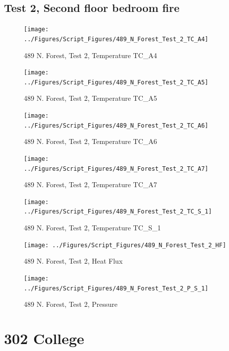 \documentclass[12pt,oneside]{book}
\begin{document}
\clearpage


\subsection{Test 2, Second floor bedroom fire}

\begin{figure}[!ht]
\texttt{[image: ../Figures/Script\_Figures/489\_N\_Forest\_Test\_2\_TC\_A4]}
\caption{489 N. Forest, Test 2, Temperature TC\_A4}
\label{fig:489_N_Forest_Test_2_TC_A4}
\end{figure}

\begin{figure}[!ht]
\texttt{[image: ../Figures/Script\_Figures/489\_N\_Forest\_Test\_2\_TC\_A5]}
\caption{489 N. Forest, Test 2, Temperature TC\_A5}
\label{fig:489_N_Forest_Test_2_TC_A5}
\end{figure}

\begin{figure}[!ht]
\texttt{[image: ../Figures/Script\_Figures/489\_N\_Forest\_Test\_2\_TC\_A6]}
\caption{489 N. Forest, Test 2, Temperature TC\_A6}
\label{fig:489_N_Forest_Test_2_TC_A6}
\end{figure}

\begin{figure}[!ht]
\texttt{[image: ../Figures/Script\_Figures/489\_N\_Forest\_Test\_2\_TC\_A7]}
\caption{489 N. Forest, Test 2, Temperature TC\_A7}
\label{fig:489_N_Forest_Test_2_TC_A7}
\end{figure}

\begin{figure}[!ht]
\texttt{[image: ../Figures/Script\_Figures/489\_N\_Forest\_Test\_2\_TC\_S\_1]}
\caption{489 N. Forest, Test 2, Temperature TC\_S\_1}
\label{fig:489_N_Forest_Test_2_TC_S_1}
\end{figure}

\begin{figure}[!ht]
\texttt{[image: ../Figures/Script\_Figures/489\_N\_Forest\_Test\_2\_HF]}
\caption{489 N. Forest, Test 2, Heat Flux}
\label{fig:489_N_Forest_Test_2_HF}
\end{figure}

\begin{figure}[!ht]
\texttt{[image: ../Figures/Script\_Figures/489\_N\_Forest\_Test\_2\_P\_S\_1]}
\caption{489 N. Forest, Test 2, Pressure}
\label{fig:489_N_Forest_Test_2_P_S_1}
\end{figure}


\clearpage


\section{302 College}
\end{document}
